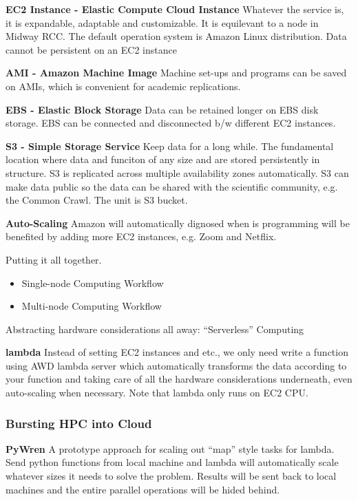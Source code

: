 \documentclass{article}
\begin{document}
\textbf{EC2 Instance - Elastic Compute Cloud Instance} Whatever the service is, it is expandable, adaptable and customizable. It is equilevant to a node in Midway RCC. The default operation system is Amazon Linux distribution. Data cannot be persistent on an EC2 instance

\textbf{AMI - Amazon Machine Image} Machine set-ups and programs can be saved on AMIs, which is convenient for academic replications.

\textbf{EBS - Elastic Block Storage} Data can be retained longer on EBS disk storage. EBS can be connected and disconnected b/w different EC2 instances.

\textbf{S3 - Simple Storage Service} Keep data for a long while. The fundamental location where data and funciton of any size and are stored persistently in structure. S3 is replicated across multiple availability zones automatically. S3 can make data public so the data can be shared with the scientific community, e.g. the Common Crawl. The unit is S3 bucket.

\textbf{Auto-Scaling} Amazon will automatically dignosed when is programming will be benefited by adding more EC2 instances, e.g. Zoom and Netflix.

Putting it all together.

\begin{itemize}
    \item Single-node Computing Workflow
    \item Multi-node Computing Workflow
\end{itemize}

Abstracting hardware considerations all away: ``Serverless'' Computing

\textbf{lambda} Instead of setting EC2 instances and etc., we only need write a function using AWD lambda server which automatically transforms the data according to your function and taking care of all the hardware considerations underneath, even auto-scaling when necessary. Note that lambda only runs on EC2 CPU.

\subsubsection{Bursting HPC into Cloud}

\textbf{PyWren} A prototype approach for scaling out ``map'' style tasks for lambda. Send python functions from local machine and lambda will automatically scale whatever sizes it needs to solve the problem. Results will be sent back to local machines and the entire parallel operations will be hided behind.
\end{document}
